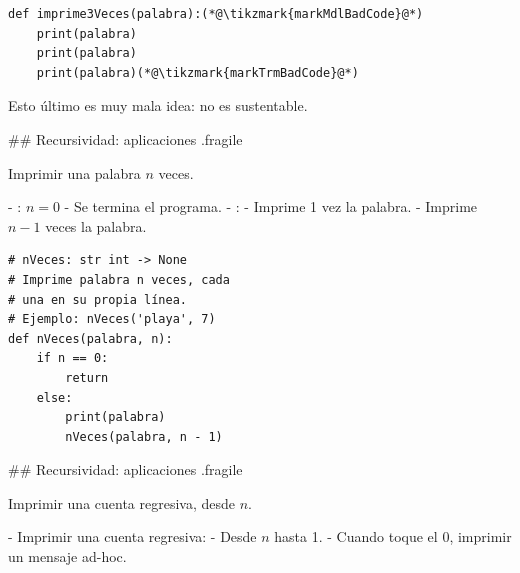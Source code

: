 \begin{lstlisting}
def imprime3Veces(palabra):(*@\tikzmark{markMdlBadCode}@*)
    print(palabra)
    print(palabra)
    print(palabra)(*@\tikzmark{markTrmBadCode}@*)
\end{lstlisting}

\trmcolumns

\pause

\vspace{-2ex}
\bgnblockdanger
Esto último es muy mala idea: no es sustentable.
\trmblockdanger


## Recursividad: aplicaciones {.fragile}

\bgnblockgood
{} Imprimir una palabra $n$ veces.
\trmblockgood

\vspace{-1ex}

\pause

\bgncolumns
{}

- : $n = 0$
    - Se termina el programa.
- :
    - Imprime 1 vez la palabra.
    - Imprime $n-1$ veces la palabra.

\pause


\begin{lstlisting}[style=frame02]
# nVeces: str int -> None
# Imprime palabra n veces, cada
# una en su propia línea.
# Ejemplo: nVeces('playa', 7)
def nVeces(palabra, n):
    if n == 0:
        return
    else:
        print(palabra)
        nVeces(palabra, n - 1)
\end{lstlisting}

\trmcolumns

## Recursividad: aplicaciones {.fragile}

\bgnblockgood
{} Imprimir una cuenta regresiva, desde $n$.
\trmblockgood

\vspace{1ex}

- Imprimir una cuenta regresiva:
    - Desde $n$ hasta 1.
    - Cuando toque el 0, imprimir un mensaje ad-hoc.

